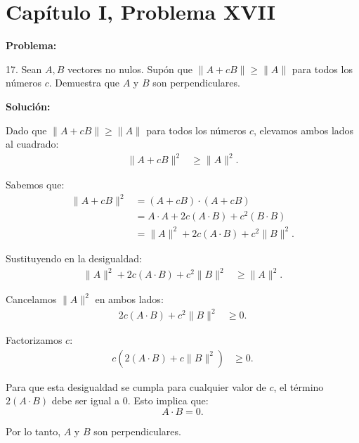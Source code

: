 \section*{Capítulo I, Problema XVII}

\textbf{Problema:}

17. Sean $A, B$ vectores no nulos. Supón que $\|A + cB\| \geq \|A\|$ para todos los números $c$. Demuestra que $A$ y $B$ son perpendiculares.

\textbf{Solución:}

Dado que $\|A + cB\| \geq \|A\|$ para todos los números $c$, elevamos ambos lados al cuadrado:
\begin{align*}
    \|A + cB\|^2 &\geq \|A\|^2.
\end{align*}

Sabemos que:
\begin{align*}
    \|A + cB\|^2 &= (A + cB) \cdot (A + cB) \\
    &= A \cdot A + 2c(A \cdot B) + c^2(B \cdot B) \\
    &= \|A\|^2 + 2c(A \cdot B) + c^2\|B\|^2.
\end{align*}

Sustituyendo en la desigualdad:
\begin{align*}
    \|A\|^2 + 2c(A \cdot B) + c^2\|B\|^2 &\geq \|A\|^2.
\end{align*}

Cancelamos $\|A\|^2$ en ambos lados:
\begin{align*}
    2c(A \cdot B) + c^2\|B\|^2 &\geq 0.
\end{align*}

Factorizamos $c$:
\begin{align*}
    c\left(2(A \cdot B) + c\|B\|^2\right) &\geq 0.
\end{align*}

Para que esta desigualdad se cumpla para cualquier valor de $c$, el término $2(A \cdot B)$ debe ser igual a $0$. Esto implica que:
\[
    A \cdot B = 0.
\]

Por lo tanto, $A$ y $B$ son perpendiculares.